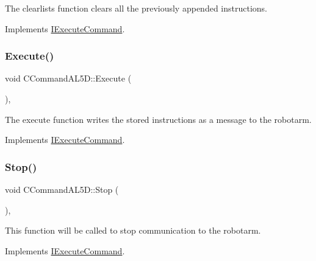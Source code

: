 The clearlists function clears all the previously appended instructions. 



Implements \hyperlink{classIExecuteCommand_a34d2dc6186873e0f6f039fd4b41e414a}{I\+Execute\+Command}.

\mbox{\label{classCCommandAL5D_ac225e1c103a802a9276f201c94281ae2}} 
\subsubsection{\texorpdfstring{Execute()}{Execute()}}
{\footnotesize\ttfamily void C\+Command\+A\+L5\+D\+::\+Execute (\begin{DoxyParamCaption}{ }\end{DoxyParamCaption})\hspace{0.3cm}{\ttfamily [override]}, {\ttfamily [virtual]}}



The execute function writes the stored instructions as a message to the robotarm. 



Implements \hyperlink{classIExecuteCommand_a8180d6931ffae55f04f9984d45a9c99f}{I\+Execute\+Command}.

\mbox{\label{classCCommandAL5D_a3cd260bd7bf8b4aa72dacc1d1ef2d38b}} 
\subsubsection{\texorpdfstring{Stop()}{Stop()}}
{\footnotesize\ttfamily void C\+Command\+A\+L5\+D\+::\+Stop (\begin{DoxyParamCaption}{ }\end{DoxyParamCaption})\hspace{0.3cm}{\ttfamily [override]}, {\ttfamily [virtual]}}



This function will be called to stop communication to the robotarm. 



Implements \hyperlink{classIExecuteCommand_a9aaabaf7284c9d295c6e2fdfc1445ca4}{I\+Execute\+Command}.

\mbox{\label{classCCommandAL5D_a308c945d4ed4009c85158a72e5db1bd5}} 
